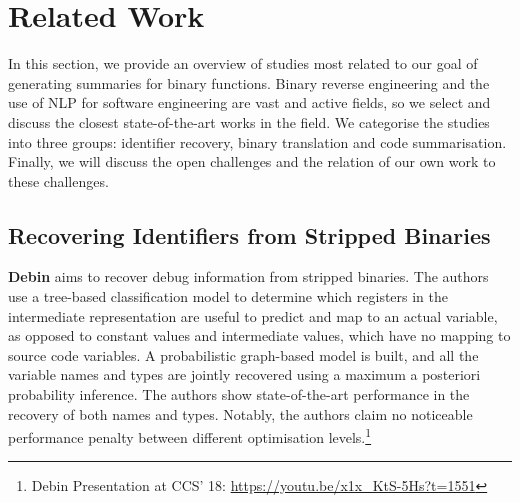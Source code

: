 \chapter{Related Work}
\label{relatedWork}
In this section, we provide an overview of studies most related to our goal of generating summaries for binary functions. Binary reverse engineering and the use of NLP for software engineering are vast and active fields, so we select and discuss the closest state-of-the-art works in the field. We categorise the studies into three groups: identifier recovery, binary translation and code summarisation. Finally, we will discuss the open challenges and the relation of our own work to these challenges. 

\section{Recovering Identifiers from Stripped Binaries}
\textbf{Debin} \cite{Debin} aims to recover debug information from stripped binaries. The authors use a tree-based classification model to determine which registers in the intermediate representation are useful to predict and map to an actual variable, as opposed to constant values and intermediate values, which have no mapping to source code variables. A probabilistic graph-based model is built, and all the variable names and types are jointly recovered using a maximum a posteriori probability inference. The authors show state-of-the-art performance in the recovery of both names and types. Notably, the authors claim no noticeable performance penalty between different optimisation levels.\footnote{Debin Presentation at CCS' 18: \url{https://youtu.be/x1x_KtS-5Hs?t=1551}} 


